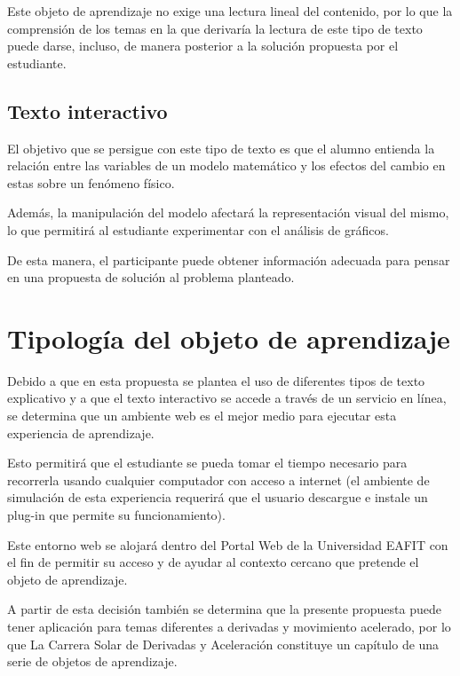 \documentclass[twoside,letterpaper,11pt]{report}
\begin{document}
Este objeto de aprendizaje no exige una lectura lineal del contenido, por lo que la comprensión de los temas en la que derivaría la lectura de este tipo de texto puede darse, incluso, de manera posterior a la solución propuesta por el estudiante.


\subsection{Texto interactivo} %
\label{sub:texto_interactivo}

El objetivo que se persigue con este tipo de texto es que el alumno entienda la relación entre las variables de un modelo matemático y los efectos del cambio en estas sobre un fenómeno físico.

Además, la manipulación del modelo afectará la representación visual del mismo, lo que permitirá al estudiante experimentar con el análisis de gráficos.

De esta manera, el participante puede obtener información adecuada para pensar en una propuesta de solución al problema planteado.


\section{Tipología del objeto de aprendizaje} %
\label{sec:tipolog_a_del_objeto_de_aprendizaje}

Debido a que en esta propuesta se plantea el uso de diferentes tipos de texto explicativo y a que el texto interactivo se accede a través de un servicio en línea, se determina que un ambiente web es el mejor medio para ejecutar esta experiencia de aprendizaje.

Esto permitirá que el estudiante se pueda tomar el tiempo necesario para recorrerla usando cualquier computador con acceso a internet (el ambiente de simulación de esta experiencia requerirá que el usuario descargue e instale un plug-in que permite su funcionamiento).

Este entorno web se alojará dentro del Portal Web de la Universidad EAFIT con el fin de permitir su acceso y de ayudar al contexto cercano que pretende el objeto de aprendizaje.
 
A partir de esta decisión también se determina que la presente propuesta puede tener aplicación para temas diferentes a derivadas y movimiento acelerado, por lo que La Carrera Solar de Derivadas y Aceleración constituye un capítulo de una serie de objetos de aprendizaje. 
\end{document}
